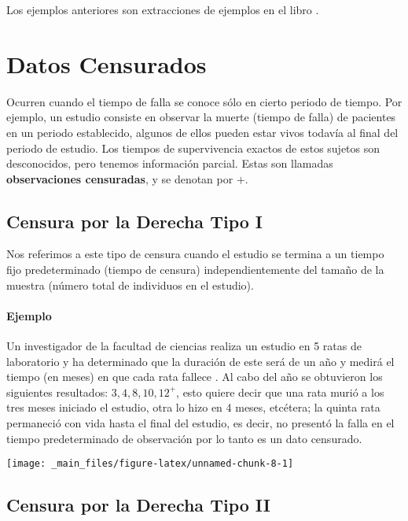 \documentclass[
  a4paper,
  oneside,
  openany]{book}
\begin{document}
Los ejemplos anteriores son extracciones de ejemplos en el libro \citep{klein2006survival}.

\hypertarget{datos-censurados}{%
\chapter{Datos Censurados}\label{datos-censurados}}

Ocurren cuando el tiempo de falla se conoce sólo en cierto periodo de tiempo. Por ejemplo, un estudio consiste en observar la muerte (tiempo de falla) de pacientes en un periodo establecido, algunos de ellos pueden estar vivos todavía al final del periodo de estudio. Los tiempos de supervivencia exactos de estos sujetos son desconocidos, pero tenemos información parcial. Estas son llamadas \textbf{observaciones censuradas}, y se denotan por \(+\).

\hypertarget{censura-por-la-derecha-tipo-i}{%
\section{Censura por la Derecha Tipo I}\label{censura-por-la-derecha-tipo-i}}

Nos referimos a este tipo de censura cuando el estudio se termina a un tiempo fijo predeterminado (tiempo de censura) independientemente del tamaño de la muestra (número total de individuos en el estudio).

\hypertarget{ejemplo}{%
\subsubsection*{Ejemplo}\label{ejemplo}}


Un investigador de la facultad de ciencias realiza un estudio en 5 ratas de laboratorio y ha determinado que la duración de este será de un año y medirá el tiempo (en meses) en que cada rata fallece . Al cabo del año se obtuvieron los siguientes resultados: \(3,4,8,10,12^+\), esto quiere decir que una rata murió a los tres meses iniciado el estudio, otra lo hizo en 4 meses, etcétera; la quinta rata permaneció con vida hasta el final del estudio, es decir, no presentó la falla en el tiempo predeterminado de observación por lo tanto es un dato censurado.

\begin{center}\texttt{[image: \_main\_files/figure-latex/unnamed-chunk-8-1]} \end{center}

\hypertarget{censura-por-la-derecha-tipo-ii}{%
\section{Censura por la Derecha Tipo II}\label{censura-por-la-derecha-tipo-ii}}
\end{document}
